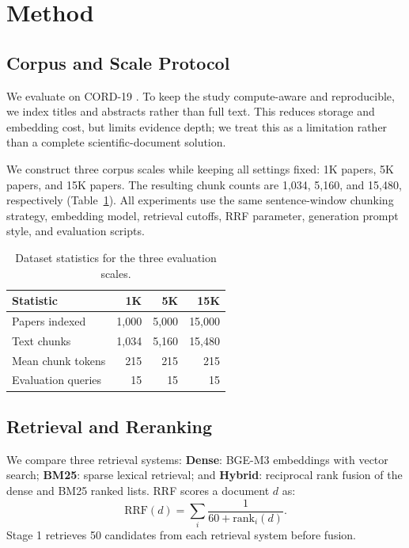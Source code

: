 \documentclass[11pt]{article}
\begin{document}
\section{Method}

\subsection{Corpus and Scale Protocol}

We evaluate on CORD-19 \citep{wang2020cord19}. To keep the study compute-aware and reproducible, we index titles and abstracts rather than full text. This reduces storage and embedding cost, but limits evidence depth; we treat this as a limitation rather than a complete scientific-document solution.

We construct three corpus scales while keeping all settings fixed: 1K papers, 5K papers, and 15K papers. The resulting chunk counts are 1,034, 5,160, and 15,480, respectively (Table~\ref{tab:dataset}). All experiments use the same sentence-window chunking strategy, embedding model, retrieval cutoffs, RRF parameter, generation prompt style, and evaluation scripts.

\begin{table}[t]
\centering
\small
\caption{Dataset statistics for the three evaluation scales.}
\label{tab:dataset}
\begin{tabular}{lrrr}
\toprule
Statistic & 1K & 5K & 15K \\
\midrule
Papers indexed & 1,000 & 5,000 & 15,000 \\
Text chunks & 1,034 & 5,160 & 15,480 \\
Mean chunk tokens & 215 & 215 & 215 \\
Evaluation queries & 15 & 15 & 15 \\
\bottomrule
\end{tabular}
\end{table}

\subsection{Retrieval and Reranking}

We compare three retrieval systems:
\textbf{Dense}: BGE-M3 embeddings with vector search;
\textbf{BM25}: sparse lexical retrieval;
and \textbf{Hybrid}: reciprocal rank fusion of the dense and BM25 ranked lists.
RRF scores a document $d$ as:
\begin{equation}
  \mathrm{RRF}(d)=\sum_i \frac{1}{60+\mathrm{rank}_i(d)}.
\end{equation}
Stage 1 retrieves 50 candidates from each retrieval system before fusion.
\end{document}
